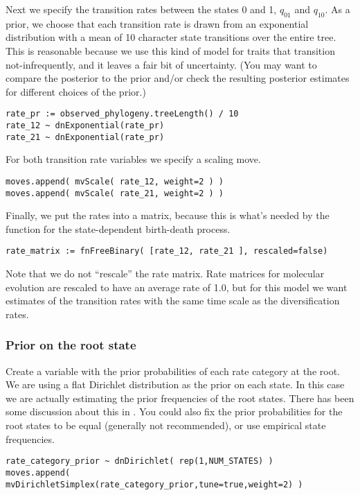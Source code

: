 Next we specify the transition rates between the states 0 and 1, $q_{01}$ and $q_{10}$.
As a prior, we choose that each transition rate is drawn from an exponential distribution with a mean of 10 character state transitions over the entire tree. 
This is reasonable because we use this kind of model for traits that transition not-infrequently, and it leaves a fair bit of uncertainty.
(You may want to compare the posterior to the prior and/or check the resulting posterior estimates for different choices of the prior.)
{\tt \begin{snugshade*}
\begin{lstlisting}
rate_pr := observed_phylogeny.treeLength() / 10
rate_12 ~ dnExponential(rate_pr)
rate_21 ~ dnExponential(rate_pr)
\end{lstlisting}
\end{snugshade*}}
For both transition rate variables we specify a scaling move.
{\tt \begin{snugshade*}
\begin{lstlisting}
moves.append( mvScale( rate_12, weight=2 ) )
moves.append( mvScale( rate_21, weight=2 ) )
\end{lstlisting}
\end{snugshade*}}
Finally, we put the rates into a matrix, because this is what's needed by the function for the state-dependent birth-death process.
{\tt \begin{snugshade*}
\begin{lstlisting}
rate_matrix := fnFreeBinary( [rate_12, rate_21 ], rescaled=false)
\end{lstlisting}
\end{snugshade*}}
Note that we do not ``rescale'' the rate matrix.
Rate matrices for molecular evolution are rescaled to have an average rate of 1.0, but for this model we want estimates of the transition rates with the same time scale as the diversification rates.

\subsubsection{Prior on the root state}
Create a variable with the prior probabilities of each rate category at the root.
We are using a flat Dirichlet distribution as the prior on each state.
In this case we are actually estimating the prior frequencies of the root states.
There has been some discussion about this in \cite{FitzJohn2009}.
You could also fix the prior probabilities for the root states to be equal (generally not recommended), or use empirical state frequencies. 
{\tt \begin{snugshade*}
\begin{lstlisting}
rate_category_prior ~ dnDirichlet( rep(1,NUM_STATES) )
moves.append( mvDirichletSimplex(rate_category_prior,tune=true,weight=2) )
\end{lstlisting}
\end{snugshade*}}

